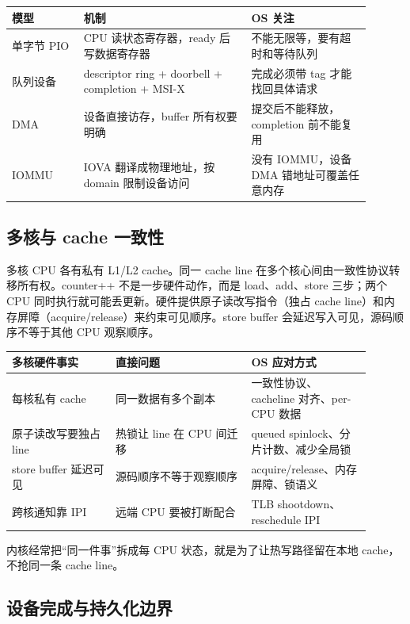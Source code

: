\begin{longtable}{p{0.18\linewidth}p{0.42\linewidth}p{0.3\linewidth}}
\toprule
模型 & 机制 & OS 关注 \\
\midrule
单字节 PIO & CPU 读状态寄存器，ready 后写数据寄存器 & 不能无限等，要有超时和等待队列 \\
队列设备 & descriptor ring + doorbell + completion + MSI-X & 完成必须带 tag 才能找回具体请求 \\
DMA & 设备直接访存，buffer 所有权要明确 & 提交后不能释放，completion 前不能复用 \\
IOMMU & IOVA 翻译成物理地址，按 domain 限制设备访问 & 没有 IOMMU，设备 DMA 错地址可覆盖任意内存 \\
\bottomrule
\end{longtable}

\subsection{多核与 cache 一致性}

多核 CPU 各有私有 L1/L2 cache。同一 cache line 在多个核心间由一致性协议转移所有权。counter++ 不是一步硬件动作，而是 load、add、store 三步；两个 CPU 同时执行就可能丢更新。硬件提供原子读改写指令（独占 cache line）和内存屏障（acquire/release）来约束可见顺序。store buffer 会延迟写入可见，源码顺序不等于其他 CPU 观察顺序。

\begin{longtable}{p{0.26\linewidth}p{0.34\linewidth}p{0.3\linewidth}}
\toprule
多核硬件事实 & 直接问题 & OS 应对方式 \\
\midrule
每核私有 cache & 同一数据有多个副本 & 一致性协议、cacheline 对齐、per-CPU 数据 \\
原子读改写要独占 line & 热锁让 line 在 CPU 间迁移 & queued spinlock、分片计数、减少全局锁 \\
store buffer 延迟可见 & 源码顺序不等于观察顺序 & acquire/release、内存屏障、锁语义 \\
跨核通知靠 IPI & 远端 CPU 要被打断配合 & TLB shootdown、reschedule IPI \\
\bottomrule
\end{longtable}

内核经常把“同一件事”拆成每 CPU 状态，就是为了让热写路径留在本地 cache，不抢同一条 cache line。

\subsection{设备完成与持久化边界}

